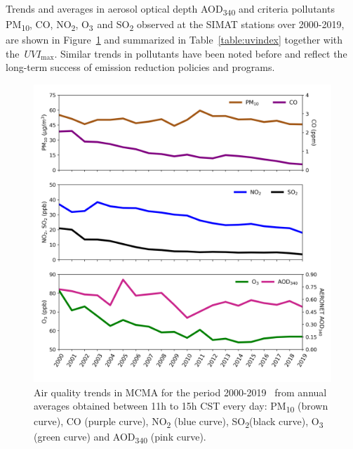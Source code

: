 \documentclass[10pt]{article}
\begin{document}
Trends and averages in aerosol optical depth AOD\textsubscript{340} and
criteria pollutants PM\textsubscript{10}, CO, NO\textsubscript{2},
O\textsubscript{3~}and SO\textsubscript{2} observed at the SIMAT
stations over 2000-2019, are shown in
Figure~{\ref{829996}} and summarized in
Table~{\ref{table:uvindex}} together with
the~\(UVI_{\max}\). Similar trends in pollutants have been noted
before\cite{Parrish_2011,2017,Molina_2019} and reflect the long-term success of
emission reduction policies and programs.
\begin{figure}[H]
  \begin{center}
    \includegraphics[width=0.63\columnwidth]{figures/pollutants}
    \caption{{Air quality trends in MCMA for the period 2000-2019~ from annual
    averages obtained between 11h to 15h CST every day: PM\textsubscript{10}
    (brown curve), CO (purple curve), NO\textsubscript{2} (blue curve),
    SO\textsubscript{2}(black curve), O\textsubscript{3} (green curve) and
    AOD\textsubscript{340} (pink curve).
    {\label{829996}}%
    }}
  \end{center}
\end{figure}
\end{document}
